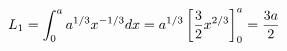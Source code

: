 \documentclass[preview]{standalone}
\begin{document}
\begin{align*}
\special{dvisvgm:raw <g id='unique000'>}L_1=\displaystyle\int_0^a a^{1/3}x^{-1/3}dx=a^{1/3}\left[\dfrac{3}{2}x^{2/3}\right]_0^a=\dfrac{3a}{2}\special{dvisvgm:raw </g>}
\end{align*}
\end{document}
